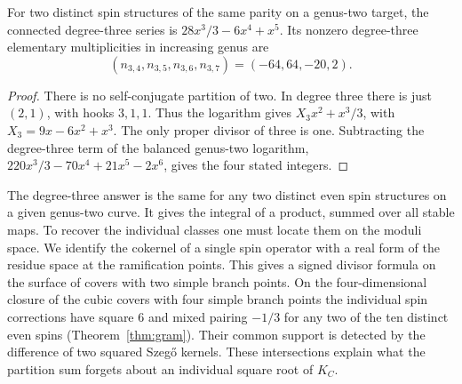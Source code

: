\begin{corollary}\label{cor:cubic}
For two distinct spin structures of the same parity on a genus-two
target, the connected degree-three series is
\(28x^3/3-6x^4+x^5\). Its nonzero degree-three elementary
multiplicities in increasing genus are
\[
 (n_{3,4},n_{3,5},n_{3,6},n_{3,7})=(-64,64,-20,2).
\]
\end{corollary}
\begin{proof}
There is no self-conjugate partition of two. In degree three there
is just \((2,1)\), with hooks \(3,1,1\). Thus the logarithm gives
\(X_3x^2+x^3/3\), with \(X_3=9x-6x^2+x^3\). The only proper
divisor of three is one. Subtracting the degree-three term of the
balanced genus-two logarithm,
\(220x^3/3-70x^4+21x^5-2x^6\), gives the four stated integers.
\end{proof}

The degree-three answer is the same for any two distinct even
spin structures on a given genus-two curve. It gives the integral
of a product, summed over all stable maps. To recover the individual
classes one must locate them on the moduli space. We identify the
cokernel of a single spin operator with a real form of the residue
space at the ramification points. This gives a signed divisor formula
on the surface of covers with two simple branch points. On the
four-dimensional closure of the cubic covers with four simple branch
points the individual spin corrections have square \(6\) and mixed
pairing \(-1/3\) for any two of the ten distinct even spins
(Theorem~\ref{thm:gram}). Their common support is detected by the
difference of two squared Szeg\H{o} kernels. These intersections
explain what the partition sum forgets about an individual square
root of \(K_C\).

